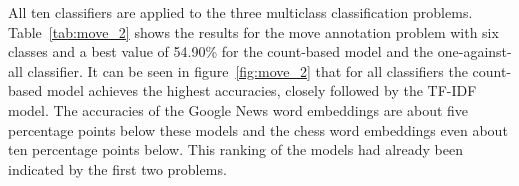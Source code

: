 \documentclass[article,type=msc,colorback,accentcolor=tud7b]{tudthesis}
\begin{document}
    \begin{figure}[H]
      \begin{floatrow}
      \end{floatrow}
    \end{figure}

All ten classifiers are applied to the three multiclass classification problems. Table~\ref{tab:move_2} shows the results for the move annotation problem with six classes and a best value of 54.90\% for the count-based model and the one-against-all classifier. It can be seen in figure~\ref{fig:move_2} that for all classifiers the count-based model achieves the highest accuracies, closely followed by the TF-IDF model. The accuracies of the Google News word embeddings are about five percentage points below these models and the chess word embeddings even about ten percentage points below. This ranking of the models had already been indicated by the first two problems.
\end{document}
